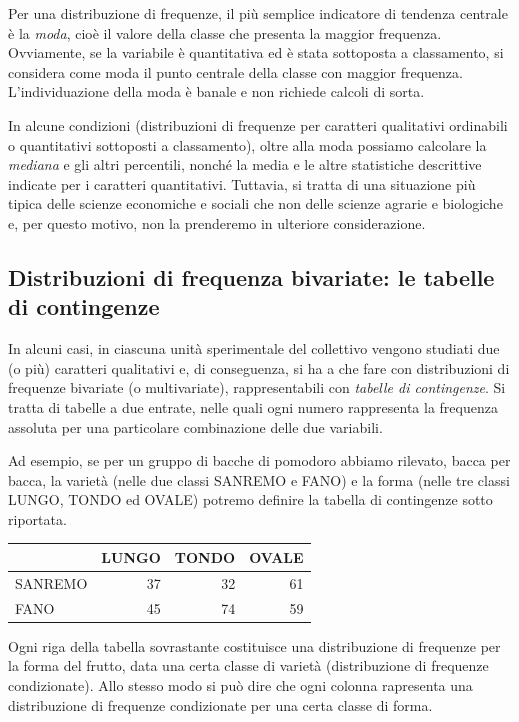 \documentclass[a4paper,12pt,oneside]{book}
\begin{document}
Per una distribuzione di frequenze, il più semplice indicatore di tendenza centrale è la \emph{moda}, cioè il valore della classe che presenta la maggior frequenza. Ovviamente, se la variabile è quantitativa ed è stata sottoposta a classamento, si considera come moda il punto centrale della classe con maggior frequenza. L'individuazione della moda è banale e non richiede calcoli di sorta.

In alcune condizioni (distribuzioni di frequenze per caratteri qualitativi ordinabili o quantitativi sottoposti a classamento), oltre alla moda possiamo calcolare la \emph{mediana} e gli altri percentili, nonché la media e le altre statistiche descrittive indicate per i caratteri quantitativi. Tuttavia, si tratta di una situazione più tipica delle scienze economiche e sociali che non delle scienze agrarie e biologiche e, per questo motivo, non la prenderemo in ulteriore considerazione.

\hypertarget{distribuzioni-di-frequenza-bivariate-le-tabelle-di-contingenze}{%
\subsection{Distribuzioni di frequenza bivariate: le tabelle di contingenze}\label{distribuzioni-di-frequenza-bivariate-le-tabelle-di-contingenze}}

In alcuni casi, in ciascuna unità sperimentale del collettivo vengono studiati due (o più) caratteri qualitativi e, di conseguenza, si ha a che fare con distribuzioni di frequenze bivariate (o multivariate), rappresentabili con \emph{tabelle di contingenze}. Si tratta di tabelle a due entrate, nelle quali ogni numero rappresenta la frequenza assoluta per una particolare combinazione delle due variabili.

Ad esempio, se per un gruppo di bacche di pomodoro abbiamo rilevato, bacca per bacca, la varietà (nelle due classi SANREMO e FANO) e la forma (nelle tre classi LUNGO, TONDO ed OVALE) potremo definire la tabella di contingenze sotto riportata.

\begin{tabular}{l|r|r|r}
\hline
  & LUNGO & TONDO & OVALE\\
\hline
SANREMO & 37 & 32 & 61\\
\hline
FANO & 45 & 74 & 59\\
\hline
\end{tabular}

Ogni riga della tabella sovrastante costituisce una distribuzione di frequenze per la forma del frutto, data una certa classe di varietà (distribuzione di frequenze condizionate). Allo stesso modo si può dire che ogni colonna rapresenta una distribuzione di frequenze condizionate per una certa classe di forma.
\end{document}
